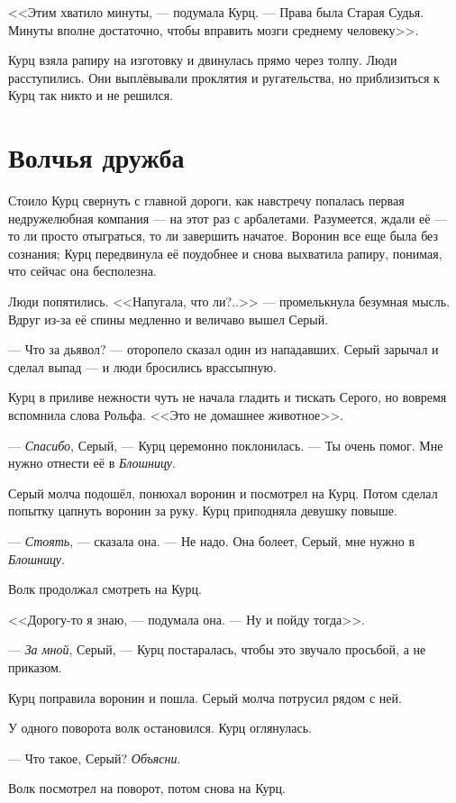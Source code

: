 <<Этим хватило минуты, --- подумала Курц.
--- Права была Старая Судья.
Минуты вполне достаточно, чтобы вправить мозги среднему человеку>>.

Курц взяла рапиру на изготовку и двинулась прямо через толпу.
Люди расступились.
Они выплёвывали проклятия и ругательства, но приблизиться к Курц так никто и не решился.

\section{Волчья дружба}

Стоило Курц свернуть с главной дороги, как навстречу попалась первая недружелюбная компания --- на этот раз с арбалетами.
Разумеется, ждали её --- то ли просто отыграться, то ли завершить начатое.
Воронин все еще была без сознания;
Курц передвинула её поудобнее и снова выхватила рапиру, понимая, что сейчас она бесполезна.

Люди попятились.
<<Напугала, что ли?..>> --- промелькнула безумная мысль.
Вдруг из-за её спины медленно и величаво вышел Серый.

--- Что за дьявол? --- оторопело сказал один из нападавших.
Серый зарычал и сделал выпад --- и люди бросились врассыпную.

Курц в приливе нежности чуть не начала гладить и тискать Серого, но вовремя вспомнила слова Рольфа.
<<Это не домашнее животное>>.

--- \textit{Спасибо}, Серый, --- Курц церемонно поклонилась.
--- Ты очень помог.
Мне нужно отнести её в \textit{Блошницу}.

Серый молча подошёл, понюхал воронин и посмотрел на Курц.
Потом сделал попытку цапнуть воронин за руку.
Курц приподняла девушку повыше.

--- \textit{Стоять}, --- сказала она.
--- Не надо.
Она болеет, Серый, мне нужно в \textit{Блошницу}.

Волк продолжал смотреть на Курц.

<<Дорогу-то я знаю, --- подумала она.
--- Ну и пойду тогда>>.

--- \textit{За мной}, Серый, --- Курц постаралась, чтобы это звучало просьбой, а не приказом.

Курц поправила воронин и пошла.
Серый молча потрусил рядом с ней.

У одного поворота волк остановился.
Курц оглянулась.

--- Что такое, Серый?
\textit{Объясни}.

Волк посмотрел на поворот, потом снова на Курц.

